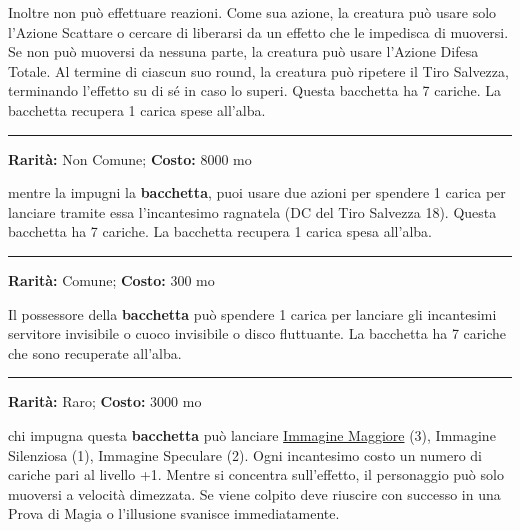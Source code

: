 \begin{multicols}{2}
Inoltre non può effettuare reazioni. Come sua azione, la creatura può usare solo l'Azione Scattare o cercare di liberarsi da un effetto che le impedisca di muoversi. Se non può muoversi da nessuna parte, la creatura può usare l'Azione Difesa Totale. Al termine di ciascun suo round, la creatura può ripetere il Tiro Salvezza, terminando l'effetto su di sé in caso lo superi. Questa bacchetta ha 7 cariche. La bacchetta recupera 1 carica spese all'alba.

\smallskip\noindent\rule{\linewidth}{2pt}  \hypertarget{BacchettadellaRagnatela}{}\smallskip{}\noindent\label{BacchettadellaRagnatela}

\textbf{Rarità:} Non Comune; \textbf{Costo:} 8000 mo

mentre la impugni la \textbf{bacchetta}, puoi usare due azioni per spendere 1 carica per lanciare tramite essa l'incantesimo ragnatela (DC del Tiro Salvezza 18). Questa bacchetta ha 7 cariche. La bacchetta recupera 1 carica spesa all'alba.

\smallskip\noindent\rule{\linewidth}{2pt}  \hypertarget{BacchettadelleComodità}{}\smallskip{}\noindent\label{BacchettadelleComodità}

\textbf{Rarità:} Comune; \textbf{Costo:} 300 mo

Il possessore della \textbf{bacchetta} può spendere 1 carica per lanciare gli incantesimi servitore invisibile o cuoco invisibile o disco fluttuante. La bacchetta ha 7 cariche che sono recuperate all'alba.

\smallskip\noindent\rule{\linewidth}{2pt}  \hypertarget{BacchettadelleIllusioni}{}\smallskip{}\noindent\label{BacchettadelleIllusioni}

\textbf{Rarità:} Raro; \textbf{Costo:} 3000 mo

chi impugna questa \textbf{bacchetta} può lanciare \hyperlink{Immagine Maggiore}{Immagine Maggiore} (3), Immagine Silenziosa (1), Immagine Speculare (2). Ogni incantesimo costo un numero di cariche pari al livello +1. Mentre si concentra sull'effetto, il personaggio può solo muoversi a velocità dimezzata. Se viene colpito deve riuscire con successo in una Prova di Magia o l'illusione svanisce immediatamente.


\end{multicols}

